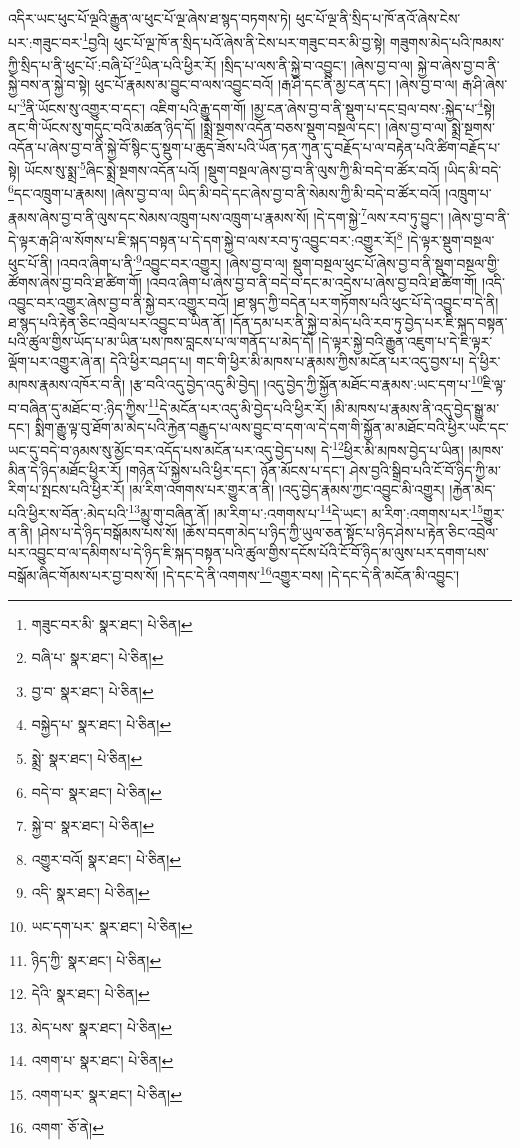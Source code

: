 འདིར་ཡང་ཕུང་པོ་ལྔའི་རྒྱུན་ལ་ཕུང་པོ་ལྔ་ཞེས་ཐ་སྙད་བཏགས་ཏེ། ཕུང་པོ་ལྔ་ནི་སྲིད་པ་ཁོ་ནའོ་ཞེས་ངེས་པར་:གཟུང་བར་\footnote{གཟུང་བར་མི་  སྣར་ཐང་།  པེ་ཅིན། }བྱའི། ཕུང་པོ་ལྔ་ཁོ་ན་སྲིད་པའོ་ཞེས་ནི་ངེས་པར་གཟུང་བར་མི་བྱ་སྟེ། གཟུགས་མེད་པའི་ཁམས་ཀྱི་སྲིད་པ་ནི་ཕུང་པོ་:བཞི་པོ་\footnote{བཞི་པ་  སྣར་ཐང་།  པེ་ཅིན། }ཡིན་པའི་ཕྱིར་རོ། །སྲིད་པ་ལས་ནི་སྐྱེ་བ་འབྱུང་། །ཞེས་བྱ་བ་ལ། སྐྱེ་བ་ཞེས་བྱ་བ་ནི་སྐྱེ་བས་ན་སྐྱེ་བ་སྟེ། ཕུང་པོ་རྣམས་མ་བྱུང་བ་ལས་འབྱུང་བའོ། །རྒ་ཤི་དང་ནི་མྱ་ངན་དང་། །ཞེས་བྱ་བ་ལ། རྒ་ཤི་ཞེས་པ་\footnote{བྱ་བ་  སྣར་ཐང་།  པེ་ཅིན། }ནི་ཡོངས་སུ་འགྱུར་བ་དང་། འཇིག་པའི་རྒྱུ་དག་གོ། །མྱ་ངན་ཞེས་བྱ་བ་ནི་སྡུག་པ་དང་བྲལ་བས་:སྐྱེད་པ་\footnote{བསྐྱེད་པ་  སྣར་ཐང་།  པེ་ཅིན། }སྟེ། ནང་གི་ཡོངས་སུ་གདུང་བའི་མཚན་ཉིད་དོ། །སྨྲེ་སྔགས་འདོན་བཅས་སྡུག་བསྔལ་དང་། །ཞེས་བྱ་བ་ལ། སྨྲེ་སྔགས་འདོན་པ་ཞེས་བྱ་བ་ནི་སྐྱེ་བོ་སྙིང་དུ་སྡུག་པ་ཆུད་ཟོས་པའི་ཡོན་ཏན་ཀུན་དུ་བརྗོད་པ་ལ་བརྟེན་པའི་ཚིག་བརྗོད་པ་སྟེ། ཡོངས་སུ་སྨྲ་\footnote{སྨྲེ་  སྣར་ཐང་།  པེ་ཅིན། }ཞིང་སྨྲེ་སྔགས་འདོན་པའོ། །སྡུག་བསྔལ་ཞེས་བྱ་བ་ནི་ལུས་ཀྱི་མི་བདེ་བ་ཚོར་བའོ། །ཡིད་མི་བདེ་\footnote{བདེ་བ་  སྣར་ཐང་།  པེ་ཅིན། }དང་འཁྲུག་པ་རྣམས། །ཞེས་བྱ་བ་ལ། ཡིད་མི་བདེ་དང་ཞེས་བྱ་བ་ནི་སེམས་ཀྱི་མི་བདེ་བ་ཚོར་བའོ། །འཁྲུག་པ་རྣམས་ཞེས་བྱ་བ་ནི་ལུས་དང་སེམས་འཁྲུག་པས་འཁྲུག་པ་རྣམས་སོ། །དེ་དག་སྐྱེ་\footnote{སྐྱེ་བ་  སྣར་ཐང་།  པེ་ཅིན། }ལས་རབ་ཏུ་བྱུང་། །ཞེས་བྱ་བ་ནི་དེ་ལྟར་རྒ་ཤི་ལ་སོགས་པ་ཇི་སྐད་བསྟན་པ་དེ་དག་སྐྱེ་བ་ལས་རབ་ཏུ་འབྱུང་བར་:འགྱུར་རོ།\footnote{འགྱུར་བའོ།  སྣར་ཐང་།  པེ་ཅིན། } །དེ་ལྟར་སྡུག་བསྔལ་ཕུང་པོ་ནི། །འབའ་ཞིག་པ་ནི་\footnote{འདི་  སྣར་ཐང་།  པེ་ཅིན། }འབྱུང་བར་འགྱུར། །ཞེས་བྱ་བ་ལ། སྡུག་བསྔལ་ཕུང་པོ་ཞེས་བྱ་བ་ནི་སྡུག་བསྔལ་གྱི་ཚོགས་ཞེས་བྱ་བའི་ཐ་ཚིག་གོ། །འབའ་ཞིག་པ་ཞེས་བྱ་བ་ནི་བདེ་བ་དང་མ་འདྲེས་པ་ཞེས་བྱ་བའི་ཐ་ཚིག་གོ། །འདི་འབྱུང་བར་འགྱུར་ཞེས་བྱ་བ་ནི་སྐྱེ་བར་འགྱུར་བའོ། །ཐ་སྙད་ཀྱི་བདེན་པར་གཏོགས་པའི་ཕུང་པོ་དེ་འབྱུང་བ་དེ་ནི། ཐ་སྙད་པའི་རྟེན་ཅིང་འབྲེལ་པར་འབྱུང་བ་ཡིན་ནོ། །དོན་དམ་པར་ནི་སྐྱེ་བ་མེད་པའི་རབ་ཏུ་བྱེད་པར་ཇི་སྐད་བསྟན་པའི་ཚུལ་གྱིས་ཡོད་པ་མ་ཡིན་པས་ཁས་བླངས་པ་ལ་གནོད་པ་མེད་དོ། །དེ་ལྟར་སྐྱེ་བའི་རྒྱུན་འཇུག་པ་དེ་ཇི་ལྟར་ལྡོག་པར་འགྱུར་ཞེ་ན། དེའི་ཕྱིར་བཤད་པ། གང་གི་ཕྱིར་མི་མཁས་པ་རྣམས་ཀྱིས་མངོན་པར་འདུ་བྱས་པ། དེ་ཕྱིར་མཁས་རྣམས་འཁོར་བ་ནི། །རྩ་བའི་འདུ་བྱེད་འདུ་མི་བྱེད། །འདུ་བྱེད་ཀྱི་སྐྱོན་མཐོང་བ་རྣམས་:ཡང་དག་པ་\footnote{ཡང་དག་པར་  སྣར་ཐང་།  པེ་ཅིན། }ཇི་ལྟ་བ་བཞིན་དུ་མཐོང་བ་:ཉིད་ཀྱིས་\footnote{ཉིད་ཀྱི་  སྣར་ཐང་།  པེ་ཅིན། }དེ་མངོན་པར་འདུ་མི་བྱེད་པའི་ཕྱིར་རོ། །མི་མཁས་པ་རྣམས་ནི་འདུ་བྱེད་སྒྱུ་མ་དང་། སྨིག་རྒྱུ་ལྟ་བུ་ཐོག་མ་མེད་པའི་རྐྱེན་བརྒྱུད་པ་ལས་བྱུང་བ་དག་ལ་དེ་དག་གི་སྐྱོན་མ་མཐོང་བའི་ཕྱིར་ཡང་དང་ཡང་དུ་བདེ་བ་ཉམས་སུ་མྱོང་བར་འདོད་པས་མངོན་པར་འདུ་བྱེད་པས། དེ་\footnote{དེའི་  སྣར་ཐང་།  པེ་ཅིན། }ཕྱིར་མི་མཁས་བྱེད་པ་ཡིན། །མཁས་མིན་དེ་ཉིད་མཐོང་ཕྱིར་རོ། །གཉེན་པོ་སྐྱེས་པའི་ཕྱིར་དང་། ཉོན་མོངས་པ་དང་། ཤེས་བྱའི་སྒྲིབ་པའི་ངོ་བོ་ཉིད་ཀྱི་མ་རིག་པ་སྤངས་པའི་ཕྱིར་རོ། །མ་རིག་འགགས་པར་གྱུར་ན་ནི། །འདུ་བྱེད་རྣམས་ཀྱང་འབྱུང་མི་འགྱུར། །རྐྱེན་མེད་པའི་ཕྱིར་ས་བོན་:མེད་པའི་\footnote{མེད་པས་  སྣར་ཐང་།  པེ་ཅིན། }མྱུ་གུ་བཞིན་ནོ། །མ་རིག་པ་:འགགས་པ་\footnote{འགག་པ་  སྣར་ཐང་།  པེ་ཅིན། }དེ་ཡང་། མ་རིག་:འགགས་པར་\footnote{འགག་པར་  སྣར་ཐང་།  པེ་ཅིན། }གྱུར་ན་ནི། །ཤེས་པ་དེ་ཉིད་བསྒོམས་པས་སོ། །ཆོས་བདག་མེད་པ་ཉིད་ཀྱི་ཡུལ་ཅན་སྟོང་པ་ཉིད་ཤེས་པ་རྟེན་ཅིང་འབྲེལ་པར་འབྱུང་བ་ལ་དམིགས་པ་དེ་ཉིད་ཇི་སྐད་བསྟན་པའི་ཚུལ་གྱིས་དངོས་པོའི་ངོ་བོ་ཉིད་མ་ལུས་པར་དགག་པས་བསྒོམ་ཞིང་གོམས་པར་བྱ་བས་སོ། །དེ་དང་དེ་ནི་འགགས་\footnote{འགག་  ཅོ་ནེ། }འགྱུར་བས། །དེ་དང་དེ་ནི་མངོན་མི་འབྱུང་། 